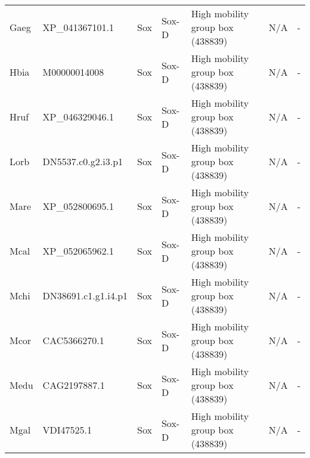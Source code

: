 \documentclass[../main.tex]{subfiles}
\begin{document}
\begin{landscape}
\begin{longtable}{lllllll}
		Gaeg           & XP\_041367101.1       & Sox            & Sox-D               & High mobility group box (438839)            & N/A                                                                    & -                    \\
		Hbia           & M00000014008          & Sox            & Sox-D               & High mobility group box (438839)            & N/A                                                                    & -                    \\
		Hruf           & XP\_046329046.1       & Sox            & Sox-D               & High mobility group box (438839)            & N/A                                                                    & -                    \\
		Lorb           & DN5537.c0.g2.i3.p1    & Sox            & Sox-D               & High mobility group box (438839)            & N/A                                                                    & -                    \\
		Mare           & XP\_052800695.1       & Sox            & Sox-D               & High mobility group box (438839)            & N/A                                                                    & -                    \\
		Mcal           & XP\_052065962.1       & Sox            & Sox-D               & High mobility group box (438839)            & N/A                                                                    & -                    \\
		Mchi           & DN38691.c1.g1.i4.p1   & Sox            & Sox-D               & High mobility group box (438839)            & N/A                                                                    & -                    \\
		Mcor           & CAC5366270.1          & Sox            & Sox-D               & High mobility group box (438839)            & N/A                                                                    & -                    \\
		Medu           & CAG2197887.1          & Sox            & Sox-D               & High mobility group box (438839)            & N/A                                                                    & -                    \\
		Mgal           & VDI47525.1            & Sox            & Sox-D               & High mobility group box (438839)            & N/A                                                                    & -                    \\

\end{longtable}
\end{landscape}
\end{document}
